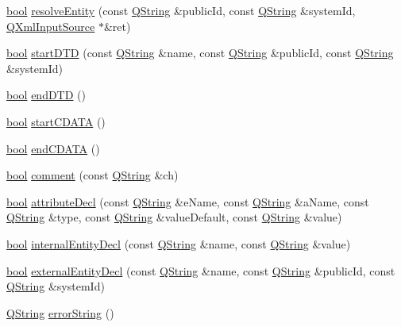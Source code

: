 \begin{DoxyCompactItemize}
\item 
\hyperlink{qglobal_8h_a1062901a7428fdd9c7f180f5e01ea056}{bool} \hyperlink{class_q_xml_default_handler_ac2fa1a7aff599d2832fca1d650a435a7}{resolve\+Entity} (const \hyperlink{class_q_string}{Q\+String} \&public\+Id, const \hyperlink{class_q_string}{Q\+String} \&system\+Id, \hyperlink{class_q_xml_input_source}{Q\+Xml\+Input\+Source} $\ast$\&ret)
\item 
\hyperlink{qglobal_8h_a1062901a7428fdd9c7f180f5e01ea056}{bool} \hyperlink{class_q_xml_default_handler_a998b69468c42957be5d2778cadece341}{start\+D\+T\+D} (const \hyperlink{class_q_string}{Q\+String} \&name, const \hyperlink{class_q_string}{Q\+String} \&public\+Id, const \hyperlink{class_q_string}{Q\+String} \&system\+Id)
\item 
\hyperlink{qglobal_8h_a1062901a7428fdd9c7f180f5e01ea056}{bool} \hyperlink{class_q_xml_default_handler_abc0de9f5db640394347d6c8c4c416c84}{end\+D\+T\+D} ()
\item 
\hyperlink{qglobal_8h_a1062901a7428fdd9c7f180f5e01ea056}{bool} \hyperlink{class_q_xml_default_handler_ae6df0d67f6537d36d5d2b0261e2251aa}{start\+C\+D\+A\+T\+A} ()
\item 
\hyperlink{qglobal_8h_a1062901a7428fdd9c7f180f5e01ea056}{bool} \hyperlink{class_q_xml_default_handler_abd9e489248fd5df14d69ad0acf16aa80}{end\+C\+D\+A\+T\+A} ()
\item 
\hyperlink{qglobal_8h_a1062901a7428fdd9c7f180f5e01ea056}{bool} \hyperlink{class_q_xml_default_handler_ae9bce8afae331e60c626f61646f20465}{comment} (const \hyperlink{class_q_string}{Q\+String} \&ch)
\item 
\hyperlink{qglobal_8h_a1062901a7428fdd9c7f180f5e01ea056}{bool} \hyperlink{class_q_xml_default_handler_a59b03fd7d0242d1172a4e5d8cc8154db}{attribute\+Decl} (const \hyperlink{class_q_string}{Q\+String} \&e\+Name, const \hyperlink{class_q_string}{Q\+String} \&a\+Name, const \hyperlink{class_q_string}{Q\+String} \&type, const \hyperlink{class_q_string}{Q\+String} \&value\+Default, const \hyperlink{class_q_string}{Q\+String} \&value)
\item 
\hyperlink{qglobal_8h_a1062901a7428fdd9c7f180f5e01ea056}{bool} \hyperlink{class_q_xml_default_handler_a3bb2a9a06a78ec957e3fed5a909a8e1c}{internal\+Entity\+Decl} (const \hyperlink{class_q_string}{Q\+String} \&name, const \hyperlink{class_q_string}{Q\+String} \&value)
\item 
\hyperlink{qglobal_8h_a1062901a7428fdd9c7f180f5e01ea056}{bool} \hyperlink{class_q_xml_default_handler_ac66a6f6bd7275b4515c21c6542a84138}{external\+Entity\+Decl} (const \hyperlink{class_q_string}{Q\+String} \&name, const \hyperlink{class_q_string}{Q\+String} \&public\+Id, const \hyperlink{class_q_string}{Q\+String} \&system\+Id)
\item 
\hyperlink{class_q_string}{Q\+String} \hyperlink{class_q_xml_default_handler_afcbe5fdce86cea4b7863e752c2413c45}{error\+String} ()
\end{DoxyCompactItemize}


